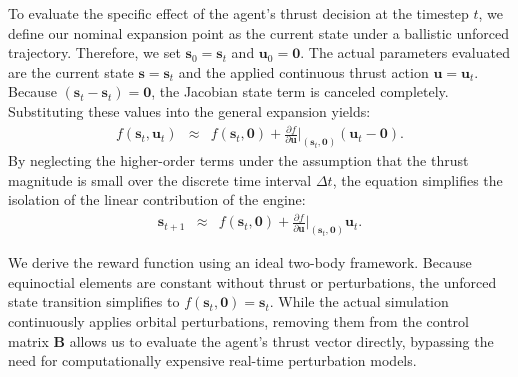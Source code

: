 \documentclass[paper]{ieice}
\begin{document}
To evaluate the specific effect of the agent's thrust decision at the timestep $t$, we define our nominal expansion point as the current state under a ballistic unforced trajectory. Therefore, we set $\mathbf{s}_0 = \mathbf{s}_t$ and $\mathbf{u}_0 = \mathbf{0}$. The actual parameters evaluated are the current state $\mathbf{s} = \mathbf{s}_t$ and the applied continuous thrust action $\mathbf{u} = \mathbf{u}_t$. Because $(\mathbf{s}_t - \mathbf{s}_t) = \mathbf{0}$, the Jacobian state term is canceled completely. Substituting these values into the general expansion yields:
\begin{eqnarray}
    f(\mathbf{s}_t, \mathbf{u}_t)
    & \approx &
    f(\mathbf{s}_t, \mathbf{0})
    + \frac{\partial f}{\partial \mathbf{u}}\bigg|_{(\mathbf{s}_t, \mathbf{0})} \!(\mathbf{u}_t \!- \mathbf{0}).
\end{eqnarray}
By neglecting the higher-order terms under the assumption that the thrust magnitude is small over the discrete time interval $\Delta t$, the equation simplifies the isolation of the linear contribution of the engine:
\begin{eqnarray}
    \mathbf{s}_{t+1}
    & \approx &
    f(\mathbf{s}_t, \mathbf{0}) + \frac{\partial f}{\partial \mathbf{u}}\bigg|_{(\mathbf{s}_t, \mathbf{0})} \mathbf{u}_t.
\end{eqnarray}

We derive the reward function using an ideal two-body framework. Because equinoctial elements are constant without thrust or perturbations, the unforced state transition simplifies to $f(\mathbf{s}_t, \mathbf{0}) = \mathbf{s}_t$. While the actual simulation continuously applies orbital perturbations, removing them from the control matrix $\mathbf{B}$ allows us to evaluate the agent's thrust vector directly, bypassing the need for computationally expensive real-time perturbation models.
\end{document}
